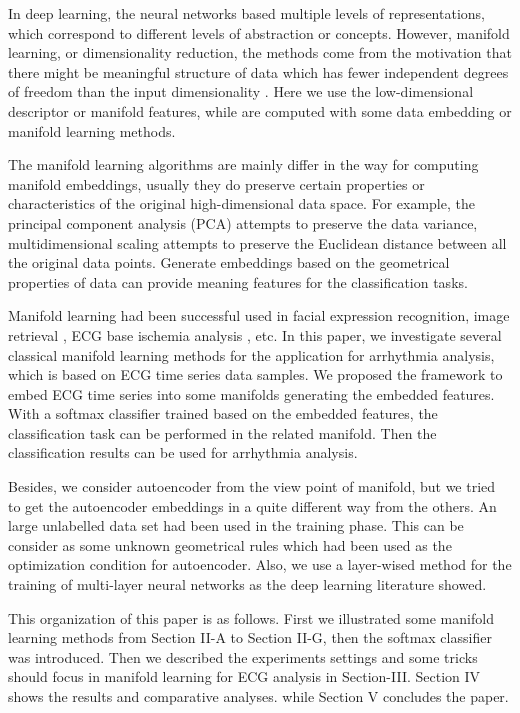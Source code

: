 \documentclass[journal]{IEEEtran}
\begin{document}
In deep learning, the neural networks based multiple levels of representations, which correspond to different levels of abstraction or concepts.
However, manifold learning, or dimensionality reduction, the methods come from the motivation that there might be meaningful structure of data which has fewer independent degrees of freedom than the input dimensionality \cite{tenenbaum2000global, roweis2000nonlinear}.
Here we use the low-dimensional descriptor or manifold features, while are computed with some data embedding or manifold learning methods.

The manifold learning algorithms are mainly differ in the way for computing manifold embeddings, usually they do preserve certain properties or characteristics of the original high-dimensional data space.
For example, the principal component analysis (PCA) attempts to preserve the data variance, multidimensional scaling attempts to preserve the Euclidean distance between all the original data points.
Generate embeddings based on the geometrical properties of data can provide meaning features for the classification tasks. 

Manifold learning had been successful used in facial expression recognition\cite{cheon2009natural}, image retrieval \cite{lin2005semantic}, ECG base ischemia analysis \cite{delgado2009dimensionality}, etc.
In this paper, we investigate several classical manifold learning methods for the application for arrhythmia analysis, which is based on ECG time series data samples.
We proposed the framework to embed ECG time series into some manifolds generating the embedded features. With a softmax classifier trained based on the embedded features, the classification task can be performed in the related manifold. Then the classification results can be used for arrhythmia analysis.

Besides, we consider autoencoder from the view point of manifold, but we tried to get the autoencoder embeddings in a quite different way from the others. An large unlabelled data set had been used in the training phase. This can be consider as some unknown geometrical rules which had been used as the optimization condition for autoencoder. Also, we use a layer-wised method for the training of multi-layer neural networks as the deep learning literature showed.

This organization of this paper is as follows. First we illustrated some manifold learning methods from Section II-A to Section II-G, then the softmax classifier was introduced. Then we described the experiments settings and some tricks should focus in manifold learning for ECG analysis in Section-III. Section IV shows the results and comparative analyses. while Section V concludes the paper.
\end{document}
